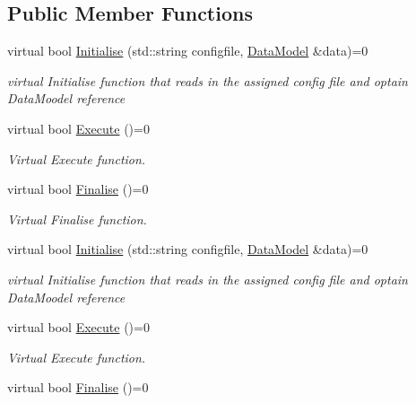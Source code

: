 \subsection*{Public Member Functions}
\begin{DoxyCompactItemize}
\item 
virtual bool \hyperlink{classTool_a4b04a99172dfe09dc97927d1feaff0ce}{Initialise} (std\-::string configfile, \hyperlink{classDataModel}{Data\-Model} \&data)=0
\begin{DoxyCompactList}\small\item\em virtual Initialise function that reads in the assigned config file and optain Data\-Moodel reference \end{DoxyCompactList}\item 
\hypertarget{classTool_a6a71469fa4efffd6fb71afbd4941e49d}{virtual bool \hyperlink{classTool_a6a71469fa4efffd6fb71afbd4941e49d}{Execute} ()=0}\label{classTool_a6a71469fa4efffd6fb71afbd4941e49d}

\begin{DoxyCompactList}\small\item\em Virtual Execute function. \end{DoxyCompactList}\item 
\hypertarget{classTool_a1f9a82fe5cc9afd63fc8eb3aaf5d80ca}{virtual bool \hyperlink{classTool_a1f9a82fe5cc9afd63fc8eb3aaf5d80ca}{Finalise} ()=0}\label{classTool_a1f9a82fe5cc9afd63fc8eb3aaf5d80ca}

\begin{DoxyCompactList}\small\item\em Virtual Finalise function. \end{DoxyCompactList}\item 
virtual bool \hyperlink{classTool_a4b04a99172dfe09dc97927d1feaff0ce}{Initialise} (std\-::string configfile, \hyperlink{classDataModel}{Data\-Model} \&data)=0
\begin{DoxyCompactList}\small\item\em virtual Initialise function that reads in the assigned config file and optain Data\-Moodel reference \end{DoxyCompactList}\item 
\hypertarget{classTool_a6a71469fa4efffd6fb71afbd4941e49d}{virtual bool \hyperlink{classTool_a6a71469fa4efffd6fb71afbd4941e49d}{Execute} ()=0}\label{classTool_a6a71469fa4efffd6fb71afbd4941e49d}

\begin{DoxyCompactList}\small\item\em Virtual Execute function. \end{DoxyCompactList}\item 
\hypertarget{classTool_a1f9a82fe5cc9afd63fc8eb3aaf5d80ca}{virtual bool \hyperlink{classTool_a1f9a82fe5cc9afd63fc8eb3aaf5d80ca}{Finalise} ()=0}\label{classTool_a1f9a82fe5cc9afd63fc8eb3aaf5d80ca}


\end{DoxyCompactItemize}
